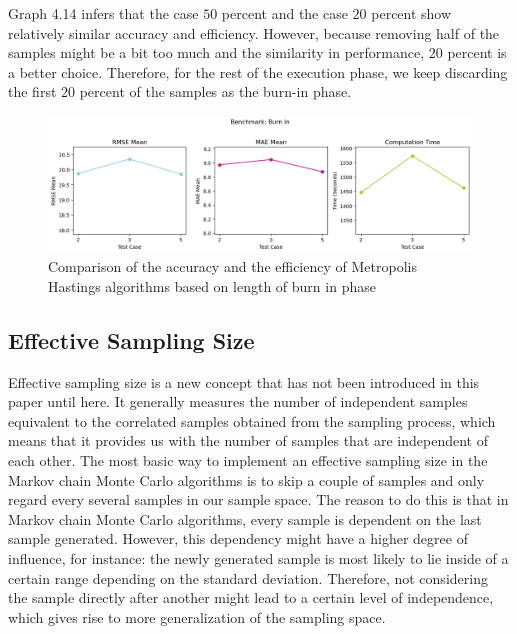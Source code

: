Graph 4.14 infers that the case $50$ percent and the case $20$ percent show relatively similar accuracy and efficiency. However, because removing half of the samples might be a bit too much and the similarity in performance, $20$ percent is a better choice. Therefore, for the rest of the execution phase, we keep discarding the first $20$ percent of the samples as the burn-in phase.

\begin{figure}[H]
    \centering
    \includegraphics[width=1\textwidth]{figures/basic_mh/benchmark/burnin_factor.png}
    \captionsetup{width=.8\textwidth}
    \caption{Comparison of the accuracy and the efficiency of Metropolis Hastings algorithms based on length of burn in phase}
    \label{fig:enter-label}
\end{figure}

\subsection{Effective Sampling Size}
Effective sampling size is a new concept that has not been introduced in this paper until here. It generally measures the number of independent samples equivalent to the correlated samples obtained from the sampling process, which means that it provides us with the number of samples that are independent of each other.\cite{effective_samples_size} The most basic way to implement an effective sampling size in the Markov chain Monte Carlo algorithms is to skip a couple of samples and only regard every several samples in our sample space. The reason to do this is that in Markov chain Monte Carlo algorithms, every sample is dependent on the last sample generated. However, this dependency might have a higher degree of influence, for instance: the newly generated sample is most likely to lie inside of a certain range depending on the standard deviation. Therefore, not considering the sample directly after another might lead to a certain level of independence, which gives rise to more generalization of the sampling space. 

